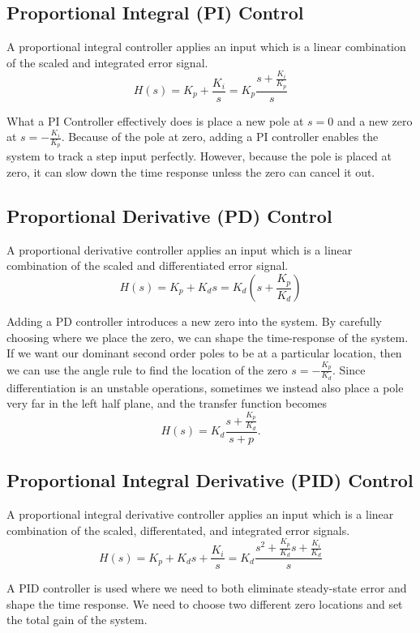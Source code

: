 \subsection{Proportional Integral (PI) Control}
\begin{definition}
  A proportional integral controller applies an input which is a linear combination of the scaled and integrated error signal.
  \[
	H(s) = K_p+\frac{K_i}{s} = K_p \frac{s + \frac{K_i}{K_p}}{s}
  \]
  \label{defn:pi-controller}
\end{definition}
What a PI Controller effectively does is place a new pole at $s=0$ and a new zero at $s=-\frac{K_i}{K_p}$.
Because of the pole at zero, adding a PI controller enables the system to track a step input perfectly.
However, because the pole is placed at zero, it can slow down the time response unless the zero can cancel it out.
\subsection{Proportional Derivative (PD) Control}
\begin{definition}
  A proportional derivative controller applies an input which is a linear combination of the scaled and differentiated error signal.
  \[
	H(s) = K_p + K_ds = K_d\left(s + \frac{K_p}{K_d}\right)
  \]
  \label{defn:pd-controller}
\end{definition}
Adding a PD controller introduces a new zero into the system. By carefully choosing where we place the zero, we can shape the time-response of the system.
If we want our dominant second order poles to be at a particular location, then we can use the angle rule to find the location of the zero $s=-\frac{K_p}{K_d}$.
Since differentiation is an unstable operations, sometimes we instead also place a pole very far in the left half plane, and the transfer function becomes
\[
  H(s) =K_d \frac{s+\frac{K_p}{K_d}}{s+p}.
\]
\subsection{Proportional Integral Derivative (PID) Control}
\begin{definition}
  A proportional integral derivative controller applies an input which is a linear combination of the scaled, differentated, and integrated error signals.
  \[
	H(s) = K_p+K_ds + \frac{K_i}{s} = K_d \frac{s^2 + \frac{K_p}{K_d}s + \frac{K_i}{K_d}}{s}
  \]
  \label{defn:pid-controller}
\end{definition}
A PID controller is used where we need to both eliminate steady-state error and shape the time response. We need to choose two different zero locations and set the total gain of the system.
